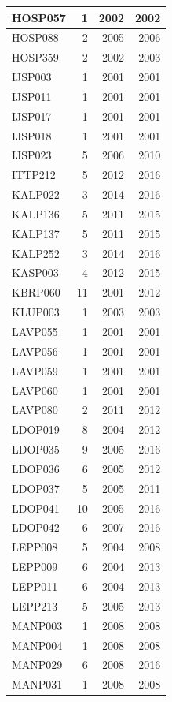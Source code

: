 \documentclass[11pt,]{book}
\begin{document}
\begin{table}
\begin{tabular}[t]{l|r|r|r}
\hline
HOSP057 & 1 & 2002 & 2002\\
\hline
HOSP088 & 2 & 2005 & 2006\\
\hline
HOSP359 & 2 & 2002 & 2003\\
\hline
IJSP003 & 1 & 2001 & 2001\\
\hline
IJSP011 & 1 & 2001 & 2001\\
\hline
IJSP017 & 1 & 2001 & 2001\\
\hline
IJSP018 & 1 & 2001 & 2001\\
\hline
IJSP023 & 5 & 2006 & 2010\\
\hline
ITTP212 & 5 & 2012 & 2016\\
\hline
KALP022 & 3 & 2014 & 2016\\
\hline
KALP136 & 5 & 2011 & 2015\\
\hline
KALP137 & 5 & 2011 & 2015\\
\hline
KALP252 & 3 & 2014 & 2016\\
\hline
KASP003 & 4 & 2012 & 2015\\
\hline
KBRP060 & 11 & 2001 & 2012\\
\hline
KLUP003 & 1 & 2003 & 2003\\
\hline
LAVP055 & 1 & 2001 & 2001\\
\hline
LAVP056 & 1 & 2001 & 2001\\
\hline
LAVP059 & 1 & 2001 & 2001\\
\hline
LAVP060 & 1 & 2001 & 2001\\
\hline
LAVP080 & 2 & 2011 & 2012\\
\hline
LDOP019 & 8 & 2004 & 2012\\
\hline
LDOP035 & 9 & 2005 & 2016\\
\hline
LDOP036 & 6 & 2005 & 2012\\
\hline
LDOP037 & 5 & 2005 & 2011\\
\hline
LDOP041 & 10 & 2005 & 2016\\
\hline
LDOP042 & 6 & 2007 & 2016\\
\hline
LEPP008 & 5 & 2004 & 2008\\
\hline
LEPP009 & 6 & 2004 & 2013\\
\hline
LEPP011 & 6 & 2004 & 2013\\
\hline
LEPP213 & 5 & 2005 & 2013\\
\hline
MANP003 & 1 & 2008 & 2008\\
\hline
MANP004 & 1 & 2008 & 2008\\
\hline
MANP029 & 6 & 2008 & 2016\\
\hline
MANP031 & 1 & 2008 & 2008\\

\end{tabular}
\end{table}
\end{document}
